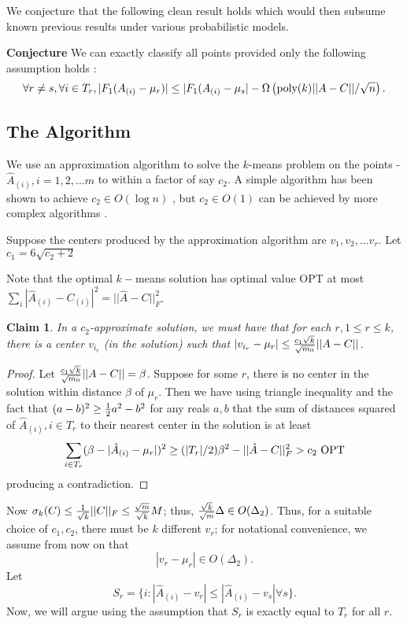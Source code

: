 \documentclass{book}
\newtheorem{claim}{Claim}
\numberwithin{exercise}{chapter}
\begin{document}
We conjecture that the following clean result holds which would then subsume known
previous results under various probabilistic models.

{\bf Conjecture} We can exactly classify all points provided only the following
assumption holds :
$$\forall r\not= s,\forall i\in T_r, |F_1(A_{(i)}-\mu_r)|\leq |F_1(A_{(i)}-\mu_s|-\Omega\left( \hbox{poly}(k)||A-C||/\sqrt n\right).$$

\subsection{The Algorithm}

We use an approximation algorithm to solve the $k$-means problem on the points -
$\hat A_{(i)}, i=1,2,\ldots m$ to within a factor of say $c_2$. A simple algorithm
has been shown to achieve $c_2\in O(\log n)$ \cite{AV2007}, but $c_2\in O(1)$ can
be achieved by more complex algorithms \cite{CGTS99}.

Suppose the centers produced by the approximation algorithm are $v_1,v_2,\ldots v_r$.
Let $c_1=6\sqrt{ c_2+2}$

Note that the optimal $k-$means solution has optimal value OPT at most
$\sum_i |\hat A_{(i)}-C_{(i)}|^2=||\hat A-C||_F^2$.

\begin{claim} In a $c_2$-approximate solution, we must have that for each
$r,1\leq r\leq k$, there is a center $v_{i_r}$ (in the solution) such that
$|v_{i_r}-\mu_r|\leq {c_1\sqrt k\over \sqrt {m_0}}|| A-C||$.
\end{claim}

\begin{proof}

Let ${c_1\sqrt k\over \sqrt {m_0}}||A-C||=\beta$.
Suppose for some $r$, there is no center in the solution within distance
$\beta$ of $\mu_r$. Then we have using triangle inequality and the fact
that $(a-b)^2\geq {1\over 2}a^2-b^2$ for any reals $a,b$
that the
sum of distances squared of $\hat A_{(i)}, i\in T_r$ to their nearest center
in the solution is at least
$$\sum_{i\in T_r} (\beta -|\hat A_{(i)}-\mu_r|)^2 \geq (|T_r|/2)\beta^2-||\hat A-C||_F^2> c_2\hbox{ OPT}$$
producing a contradiction.

\end{proof}

Now $\sigma_k(C)\leq {1\over\sqrt k}||C||_F\leq {\sqrt m\over\sqrt k}M$;
thus, ${\sqrt k\over\sqrt m}\Delta\in O(\Delta_2)$.
Thus, for a suitable choice of $c_1,c_2$,
there must be $k$ different $v_r$; for notational convenience,
we assume from now on that
\begin{equation}\label{vrmur}
|v_r-\mu_r|\in O(\Delta_2).
\end{equation}
%
Let
$$S_r=\{ i : |\hat A_{(i)}-v_r|\leq |\hat A_{(i)}-v_s|\forall s\}.$$
Now, we will argue using the assumption that $S_r$ is exactly equal to
$T_r$ for all $r$.
\end{document}
